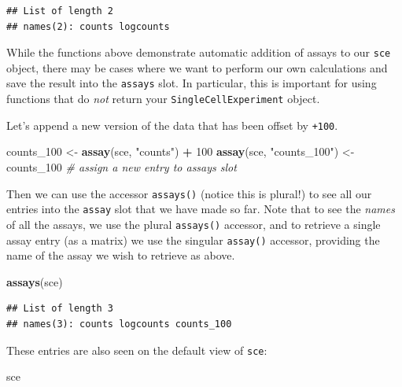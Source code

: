 \documentclass[]{book}
\newenvironment{Shaded}{\begin{snugshade}}{\end{snugshade}}
\newcommand{\CommentTok}[1]{\textcolor[rgb]{0.56,0.35,0.01}{\textit{#1}}}
\newcommand{\DecValTok}[1]{\textcolor[rgb]{0.00,0.00,0.81}{#1}}
\newcommand{\KeywordTok}[1]{\textcolor[rgb]{0.13,0.29,0.53}{\textbf{#1}}}
\newcommand{\NormalTok}[1]{#1}
\newcommand{\OperatorTok}[1]{\textcolor[rgb]{0.81,0.36,0.00}{\textbf{#1}}}
\newcommand{\StringTok}[1]{\textcolor[rgb]{0.31,0.60,0.02}{#1}}
\begin{document}
\begin{verbatim}
## List of length 2
## names(2): counts logcounts
\end{verbatim}

While the functions above demonstrate automatic addition of assays to our \texttt{sce} object, there may be cases where we want to perform our own calculations and save the result into the \texttt{assays} slot. In particular, this is important for using functions that do \emph{not} return your \texttt{SingleCellExperiment} object.

Let's append a new version of the data that has been offset by \texttt{+100}.

\begin{Shaded}
\begin{Highlighting}[]
\NormalTok{counts_}\DecValTok{100}\NormalTok{ <-}\StringTok{ }\KeywordTok{assay}\NormalTok{(sce, }\StringTok{"counts"}\NormalTok{) }\OperatorTok{+}\StringTok{ }\DecValTok{100}
\KeywordTok{assay}\NormalTok{(sce, }\StringTok{"counts_100"}\NormalTok{) <-}\StringTok{ }\NormalTok{counts_}\DecValTok{100} \CommentTok{# assign a new entry to assays slot}
\end{Highlighting}
\end{Shaded}

Then we can use the accessor \texttt{assays()} (notice this is plural!) to see all our entries into the \texttt{assay} slot that we have made so far. Note that to see the \emph{names} of all the assays, we use the plural \texttt{assays()} accessor, and to retrieve a single assay entry (as a matrix) we use the singular \texttt{assay()} accessor, providing the name of the assay we wish to retrieve as above.

\begin{Shaded}
\begin{Highlighting}[]
\KeywordTok{assays}\NormalTok{(sce)}
\end{Highlighting}
\end{Shaded}

\begin{verbatim}
## List of length 3
## names(3): counts logcounts counts_100
\end{verbatim}

These entries are also seen on the default view of \texttt{sce}:

\begin{Shaded}
\begin{Highlighting}[]
\NormalTok{sce}
\end{Highlighting}
\end{Shaded}
\end{document}
